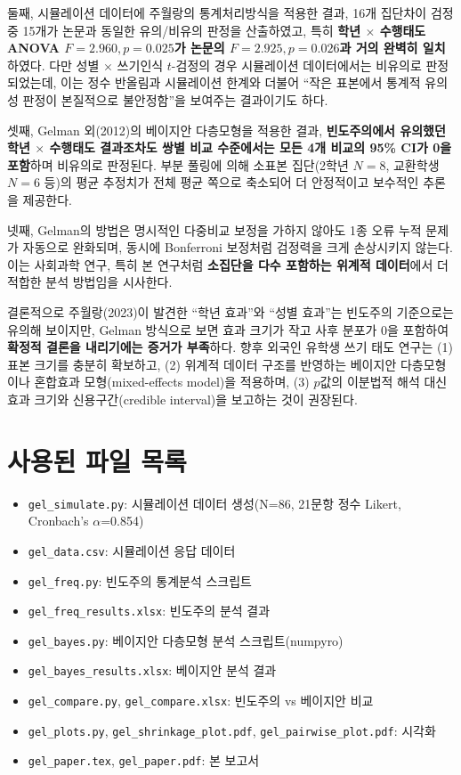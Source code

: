 \documentclass[11pt]{article}
\begin{document}
둘째, 시뮬레이션 데이터에 주월랑의 통계처리방식을 적용한 결과, 16개 집단차이 검정 중 15개가 논문과 동일한 유의/비유의 판정을 산출하였고, 특히 \textbf{학년 $\times$ 수행태도 ANOVA $F=2.960, p=0.025$가 논문의 $F=2.925, p=0.026$과 거의 완벽히 일치}하였다. 다만 성별 $\times$ 쓰기인식 $t$-검정의 경우 시뮬레이션 데이터에서는 비유의로 판정되었는데, 이는 정수 반올림과 시뮬레이션 한계와 더불어 ``작은 표본에서 통계적 유의성 판정이 본질적으로 불안정함''을 보여주는 결과이기도 하다.

셋째, Gelman 외(2012)의 베이지안 다층모형을 적용한 결과, \textbf{빈도주의에서 유의했던 학년 $\times$ 수행태도 결과조차도 쌍별 비교 수준에서는 모든 4개 비교의 95\% CI가 0을 포함}하며 비유의로 판정된다. 부분 풀링에 의해 소표본 집단(2학년 $N=8$, 교환학생 $N=6$ 등)의 평균 추정치가 전체 평균 쪽으로 축소되어 더 안정적이고 보수적인 추론을 제공한다.

넷째, Gelman의 방법은 명시적인 다중비교 보정을 가하지 않아도 1종 오류 누적 문제가 자동으로 완화되며, 동시에 Bonferroni 보정처럼 검정력을 크게 손상시키지 않는다. 이는 사회과학 연구, 특히 본 연구처럼 \textbf{소집단을 다수 포함하는 위계적 데이터}에서 더 적합한 분석 방법임을 시사한다.

결론적으로 주월랑(2023)이 발견한 ``학년 효과''와 ``성별 효과''는 빈도주의 기준으로는 유의해 보이지만, Gelman 방식으로 보면 효과 크기가 작고 사후 분포가 0을 포함하여 \textbf{확정적 결론을 내리기에는 증거가 부족}하다. 향후 외국인 유학생 쓰기 태도 연구는 (1) 표본 크기를 충분히 확보하고, (2) 위계적 데이터 구조를 반영하는 베이지안 다층모형이나 혼합효과 모형(mixed-effects model)을 적용하며, (3) $p$값의 이분법적 해석 대신 효과 크기와 신용구간(credible interval)을 보고하는 것이 권장된다.

\section*{사용된 파일 목록}
\begin{itemize}
\item \texttt{gel\_simulate.py}: 시뮬레이션 데이터 생성(N=86, 21문항 정수 Likert, Cronbach's $\alpha$=0.854)
\item \texttt{gel\_data.csv}: 시뮬레이션 응답 데이터
\item \texttt{gel\_freq.py}: 빈도주의 통계분석 스크립트
\item \texttt{gel\_freq\_results.xlsx}: 빈도주의 분석 결과
\item \texttt{gel\_bayes.py}: 베이지안 다층모형 분석 스크립트(numpyro)
\item \texttt{gel\_bayes\_results.xlsx}: 베이지안 분석 결과
\item \texttt{gel\_compare.py}, \texttt{gel\_compare.xlsx}: 빈도주의 vs 베이지안 비교
\item \texttt{gel\_plots.py}, \texttt{gel\_shrinkage\_plot.pdf}, \texttt{gel\_pairwise\_plot.pdf}: 시각화
\item \texttt{gel\_paper.tex}, \texttt{gel\_paper.pdf}: 본 보고서
\end{itemize}
\end{document}
